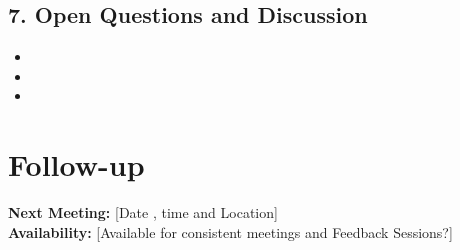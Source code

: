 \documentclass[11pt,a4paper]{article}
\begin{document}
\vspace{2em}

\subsection*{7. Open Questions and Discussion \hfill }
\begin{itemize}[leftmargin=*]
    \item 
    \item 
    \item 
\end{itemize}

\vspace{1em}

\section*{Follow-up}
\textbf{Next Meeting:} [Date , time and Location] \\
\textbf{Availability:} [Available for consistent meetings and Feedback Sessions?]
\end{document}
